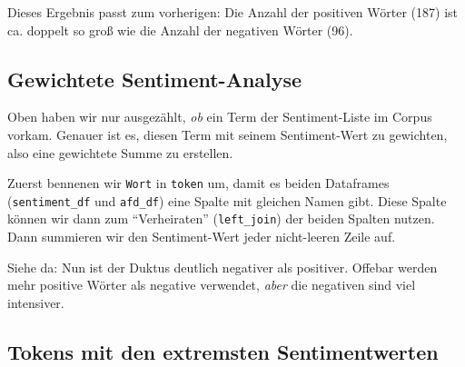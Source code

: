 \documentclass[12pt,]{book}
\newenvironment{Shaded}{\begin{snugshade}}{\end{snugshade}}
\newcommand{\KeywordTok}[1]{\textcolor[rgb]{0.13,0.29,0.53}{\textbf{{#1}}}}
\newcommand{\DataTypeTok}[1]{\textcolor[rgb]{0.13,0.29,0.53}{{#1}}}
\newcommand{\StringTok}[1]{\textcolor[rgb]{0.31,0.60,0.02}{{#1}}}
\newcommand{\CommentTok}[1]{\textcolor[rgb]{0.56,0.35,0.01}{\textit{{#1}}}}
\newcommand{\OtherTok}[1]{\textcolor[rgb]{0.56,0.35,0.01}{{#1}}}
\newcommand{\NormalTok}[1]{{#1}}
\begin{document}
Dieses Ergebnis passt zum vorherigen: Die Anzahl der positiven Wörter
(187) ist ca. doppelt so groß wie die Anzahl der negativen Wörter (96).

\subsection{Gewichtete
Sentiment-Analyse}\label{gewichtete-sentiment-analyse}

Oben haben wir nur ausgezählt, \emph{ob} ein Term der Sentiment-Liste im
Corpus vorkam. Genauer ist es, diesen Term mit seinem Sentiment-Wert zu
gewichten, also eine gewichtete Summe zu erstellen.

\begin{Shaded}
\end{Shaded}

Zuerst bennenen wir \texttt{Wort} in \texttt{token} um, damit es beiden
Dataframes (\texttt{sentiment\_df} und \texttt{afd\_df}) eine Spalte mit
gleichen Namen gibt. Diese Spalte können wir dann zum ``Verheiraten''
(\texttt{left\_join}) der beiden Spalten nutzen. Dann summieren wir den
Sentiment-Wert jeder nicht-leeren Zeile auf.

Siehe da: Nun ist der Duktus deutlich negativer als positiver. Offebar
werden mehr positive Wörter als negative verwendet, \emph{aber} die
negativen sind viel intensiver.

\subsection{Tokens mit den extremsten
Sentimentwerten}\label{tokens-mit-den-extremsten-sentimentwerten}
\end{document}

